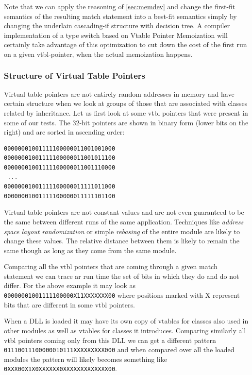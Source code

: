 \documentclass[preprint]{sigplanconf}
\begin{document}
Note that we can apply the reasoning of \textsection\ref{sec:memdev} and change 
the first-fit semantics of the resulting match statement into a best-fit 
semantics simply by changing the underlain cascading-if structure with decision 
tree. A compiler implementation of a type switch based on Vtable Pointer 
Memoization will certainly take advantage of this optimization to cut down the 
cost of the first run on a given vtbl-pointer, when the actual memoization happens.

\subsubsection{Structure of Virtual Table Pointers}
\label{sec:sovtp}

Virtual table pointers are not entirely random addresses in memory and have 
certain structure when we look at groups of those that are associated with 
classes related by inheritance. Let us first look at some vtbl pointers that 
were present in some of our tests. The 32-bit pointers are shown in binary form 
(lower bits on the right) and are sorted in ascending order:

\begin{verbatim}
00000001001111100000011001001000
00000001001111100000011001011100
00000001001111100000011001110000
 ...
00000001001111100000011111011000
00000001001111100000011111101100
\end{verbatim}

Virtual table pointers are not constant values and are not even guaranteed to be 
the same between different runs of the same application. Techniques like 
\emph{address space layout randomization} or simple \emph{rebasing} of the entire 
module are likely to change these values. The relative distance between them is 
likely to remain the same though as long as they come from the same module.

Comparing all the vtbl pointers that are coming through a given match statement 
we can trace ar run time the set of bits in which they do and do not differ. 
For the above example it may look as \texttt{00000001001111100000X11XXXXXXX00} 
where positions marked with X represent bits that are different in some vtbl 
pointers.

When a DLL is loaded it may have its own copy of vtables for classes also used 
in other modules as well as vtables for classes it introduces. Comparing 
similarly all vtbl pointers coming only from this DLL we can get a different 
pattern \\ \texttt{01110011100000010111XXXXXXXXX000} and when compared over all 
the loaded modules the pattern will likely becomes something like 
\texttt{0XXX00X1X0XXXXXX0XXXXXXXXXXXXX00}.
\end{document}

